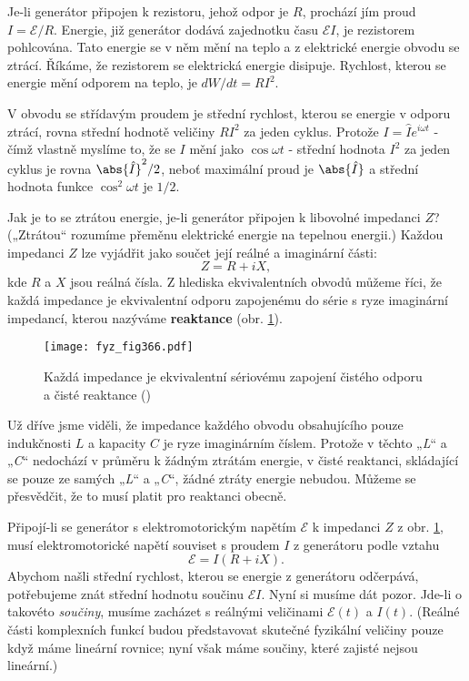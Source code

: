   Je-li generátor připojen k rezistoru, jehož odpor je \(R\), prochází jím proud 
  \(I=\mathscr{E}/R\). Energie, již generátor dodává zajednotku času \(\mathscr{E}I\), je 
  rezistorem pohlcována. Tato energie se v něm mění na teplo a z elektrické energie obvodu se 
  ztrácí. Říkáme, že rezistorem se elektrická energie disipuje. Rychlost, kterou se energie mění 
  odporem na teplo, je \(dW/dt = RI^2\).
  
  V obvodu se střídavým proudem je střední rychlost, kterou se energie v odporu ztrácí, rovna 
  střední hodnotě veličiny \(RI^2\) za jeden cyklus. Protože \(I= \hat{I}e^{i\omega t}\) - čímž 
  vlastně myslíme to, že se \(I\) mění jako \(\cos\omega t\) - střední hodnota \(I^2\) za jeden 
  cyklus je rovna \(\abs{\hat{I}}^2/2\), neboť maximální proud je \(\abs{\hat{I}}\) a střední 
  hodnota funkce \(\cos^2\omega t\) je \(1/2\).
  
  Jak je to se ztrátou energie, je-li generátor připojen k libovolné impedanci \(Z\)? („Ztrátou“ 
  rozumíme přeměnu elektrické energie na tepelnou energii.) Každou impedanci \(Z\) lze vyjádřit 
  jako součet její reálné a imaginární části:
  \begin{equation}\label{fyz:eq492}
    Z = R + iX,
  \end{equation}
  kde \(R\) a \(X\) jsou reálná čísla. Z hlediska ekvivalentních obvodů můžeme říci, že každá 
  impedance je ekvivalentní odporu zapojenému do série s ryze imaginární impedancí, kterou nazýváme 
  \textbf{reaktance} (obr. \ref{fyz:fig366}).
  
  \begin{figure}[ht!] %
    \centering
    \texttt{[image: fyz\_fig366.pdf]}
    \caption{Každá impedance je ekvivalentní sériovému zapojení čistého odporu a čisté reaktance
             (\cite[s.~406]{Feynman02})}
    \label{fyz:fig366}
  \end{figure}
  
  Už dříve jsme viděli, že impedance každého obvodu obsahujícího pouze indukčnosti \(L\) a kapacity 
  \(C\) je ryze imaginárním číslem. Protože v těchto „\emph{L}“ a „\emph{C}“ nedochází v průměru k 
  žádným ztrátám energie, v čisté reaktanci, skládající se pouze ze samých „\emph{L}“ a „\emph{C}“, 
  žádné ztráty energie nebudou. Můžeme se přesvědčit, že to musí platit pro reaktanci obecně.
  
  Připojí-li se generátor s elektromotorickým napětím \(\mathscr{E}\) k impedanci \(Z\) z obr. 
  \ref{fyz:fig366}, musí elektromotorické napětí souviset s proudem \(I\) z generátoru podle vztahu
  \begin{equation}\label{fyz:eq493}
    \mathscr{E} = I(R + iX). 
  \end{equation}
  Abychom našli střední rychlost, kterou se energie z generátoru odčerpává, potřebujeme znát 
  střední hodnotu součinu \(\mathscr{E}I\). Nyní si musíme dát pozor. Jde-li o takovéto 
  \emph{součiny}, musíme zacházet s reálnými veličinami \(\mathscr{E}(t)\) a \(I(t)\). (Reálné 
  části komplexních funkcí budou představovat skutečné fyzikální veličiny pouze když máme lineární 
  rovnice; nyní však máme součiny, které zajisté nejsou lineární.)
  
